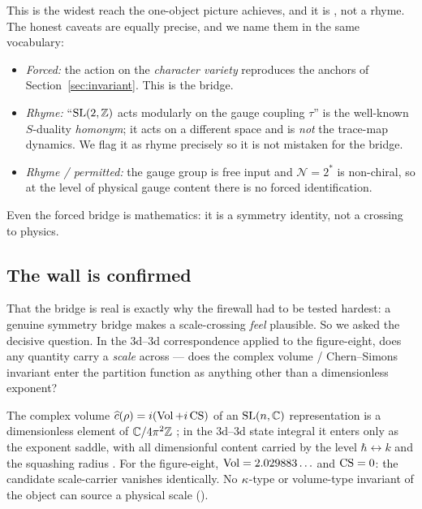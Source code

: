 This is the widest reach the one-object picture achieves, and it is \sForced, not a
rhyme. The honest caveats are equally precise, and we name them in the same vocabulary:
\begin{itemize}[leftmargin=1.4em]
\item \emph{Forced:} the action on the \emph{character variety} reproduces the anchors of
  Section~\ref{sec:invariant}. This is the bridge.
\item \emph{Rhyme:} ``$\mathrm{SL}(2,\mathbb{Z})$ acts modularly on the gauge coupling $\tau$'' is the
  well-known $S$-duality \emph{homonym}; it acts on a different space and is \emph{not}
  the trace-map dynamics. We flag it as rhyme precisely so it is not mistaken for the
  bridge.
\item \emph{Rhyme / permitted:} the gauge group is free input and $\mathcal{N}=2^\ast$ is
  non-chiral, so at the level of physical gauge content there is no forced identification.
\end{itemize}
Even the forced bridge is mathematics: it is a symmetry identity, not a crossing to
physics.

\subsection{The wall is confirmed}

That the bridge is real is exactly why the firewall had to be tested hardest: a genuine
symmetry bridge makes a scale-crossing \emph{feel} plausible. So we asked the decisive
question. In the 3d--3d correspondence applied to the figure-eight, does any quantity
carry a \emph{scale} across --- does the complex volume / Chern--Simons invariant enter
the partition function as anything other than a dimensionless exponent?

\begin{theorem}\label{thm:wall}
The complex volume $\widehat c(\rho)=i(\operatorname{Vol}+i\,\mathrm{CS})$ of an $\mathrm{SL}(n,\mathbb{C})$ representation is a
dimensionless element of $\mathbb{C}/4\pi^2\mathbb{Z}$ \cite{gtz2015}; in the 3d--3d state integral it
enters only as the exponent saddle, with all dimensionful content carried by the level
$\hbar\leftrightarrow k$ and the squashing radius \cite{dimofte2014,cordovajafferis2013}.
For the figure-eight, $\operatorname{Vol}=2.029883\ldots$ and $\mathrm{CS}=0$: the candidate scale-carrier
vanishes identically. No $\kappa$-type or volume-type invariant of the object can source a
physical scale ().
\end{theorem}

